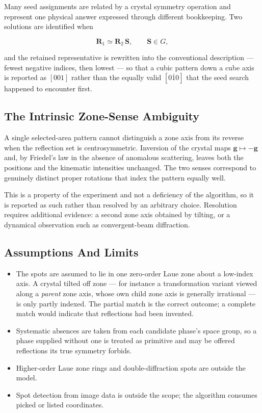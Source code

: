 Many seed assignments are related by a crystal symmetry operation and represent one physical
answer expressed through different bookkeeping. Two solutions are identified when

\begin{equation}
\mathbf{R}_{1} \simeq \mathbf{R}_{2}\,\mathbf{S},
\qquad \mathbf{S} \in G,
\end{equation}

and the retained representative is rewritten into the conventional description --- fewest negative
indices, then lowest --- so that a cubic pattern down a cube axis is reported as $[001]$ rather
than the equally valid $[0\bar{1}0]$ that the seed search happened to encounter first.

\subsection{The Intrinsic Zone-Sense Ambiguity}

A single selected-area pattern cannot distinguish a zone axis from its reverse when the
reflection set is centrosymmetric. Inversion of the crystal maps $\mathbf{g} \mapsto -\mathbf{g}$
and, by Friedel's law in the absence of anomalous scattering, leaves both the positions and the
kinematic intensities unchanged. The two senses correspond to genuinely distinct proper rotations
that index the pattern equally well.

This is a property of the experiment and not a deficiency of the algorithm, so it is reported as
such rather than resolved by an arbitrary choice. Resolution requires additional evidence: a
second zone axis obtained by tilting, or a dynamical observation such as convergent-beam
diffraction.

\subsection{Assumptions And Limits}

\begin{itemize}
  \item The spots are assumed to lie in one zero-order Laue zone about a low-index axis. A
        crystal tilted off zone --- for instance a transformation variant viewed along a
        \emph{parent} zone axis, whose own child zone axis is generally irrational --- is only
        partly indexed. The partial match is the correct outcome; a complete match would indicate
        that reflections had been invented.
  \item Systematic absences are taken from each candidate phase's space group, so a phase
        supplied without one is treated as primitive and may be offered reflections its true
        symmetry forbids.
  \item Higher-order Laue zone rings and double-diffraction spots are outside the model.
  \item Spot detection from image data is outside the scope; the algorithm consumes picked or
        listed coordinates.
\end{itemize}

